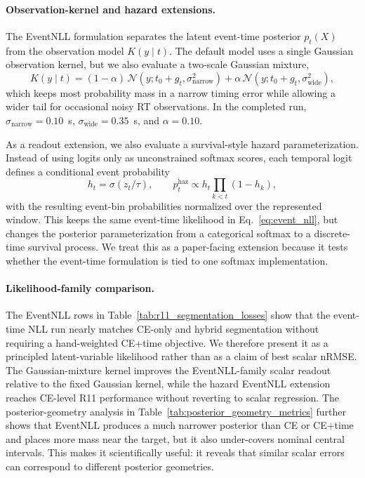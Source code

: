 \documentclass[12pt]{article}
\begin{document}
\paragraph{Observation-kernel and hazard extensions.}
The EventNLL formulation separates the latent event-time posterior $p_t(X)$ from the observation model $K(y\mid t)$. The default model uses a single Gaussian observation kernel, but we also evaluate a two-scale Gaussian mixture,
\begin{equation}
\label{eq:event_nll_mixture_kernel}
K(y\mid t)=(1-\alpha)\,\mathcal{N}(y;t_0+g_t,\sigma_{\mathrm{narrow}}^2)
+\alpha\,\mathcal{N}(y;t_0+g_t,\sigma_{\mathrm{wide}}^2),
\end{equation}
which keeps most probability mass in a narrow timing error while allowing a wider tail for occasional noisy RT observations. In the completed run, $\sigma_{\mathrm{narrow}}=0.10$~s, $\sigma_{\mathrm{wide}}=0.35$~s, and $\alpha=0.10$.

As a readout extension, we also evaluate a survival-style hazard parameterization. Instead of using logits only as unconstrained softmax scores, each temporal logit defines a conditional event probability
\begin{equation}
\label{eq:hazard_readout}
h_t=\sigma(z_t/\tau),\qquad
p_t^{\mathrm{haz}} \propto h_t\prod_{k<t}(1-h_k),
\end{equation}
with the resulting event-bin probabilities normalized over the represented window. This keeps the same event-time likelihood in Eq.~\ref{eq:event_nll}, but changes the posterior parameterization from a categorical softmax to a discrete-time survival process. We treat this as a paper-facing extension because it tests whether the event-time formulation is tied to one softmax implementation.

\paragraph{Likelihood-family comparison.}
The EventNLL rows in Table~\ref{tab:r11_segmentation_losses} show that the event-time NLL run nearly matches CE-only and hybrid segmentation without requiring a hand-weighted CE+time objective. We therefore present it as a principled latent-variable likelihood rather than as a claim of best scalar nRMSE. The Gaussian-mixture kernel improves the EventNLL-family scalar readout relative to the fixed Gaussian kernel, while the hazard EventNLL extension reaches CE-level R11 performance without reverting to scalar regression. The posterior-geometry analysis in Table~\ref{tab:posterior_geometry_metrics} further shows that EventNLL produces a much narrower posterior than CE or CE+time and places more mass near the target, but it also under-covers nominal central intervals. This makes it scientifically useful: it reveals that similar scalar errors can correspond to different posterior geometries.
\end{document}
